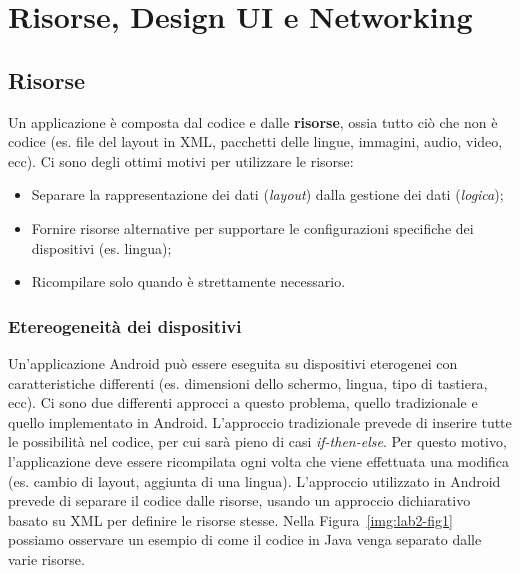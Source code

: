 \newcommand{\myparagraph}[1]{\paragraph{#1}\mbox{}\\}

\chapter{Risorse, Design UI e Networking}

\section{Risorse}

Un applicazione è composta dal codice e dalle \textbf{risorse}, ossia tutto ciò
che non è codice (es. file del layout in XML, pacchetti delle lingue, immagini,
audio, video, ecc).
Ci sono degli ottimi motivi per utilizzare le risorse:

\begin{itemize}
\item Separare la rappresentazione dei dati (\textit{layout}) dalla gestione dei
dati (\textit{logica});
\item Fornire risorse alternative per supportare le configurazioni specifiche
dei dispositivi (es. lingua);
\item Ricompilare solo quando è strettamente necessario.
\end{itemize}

\subsection{Etereogeneità dei dispositivi}

Un'applicazione Android può essere eseguita su dispositivi eterogenei con
caratteristiche differenti (es. dimensioni dello schermo, lingua, tipo di
tastiera, ecc). Ci sono due differenti approcci a questo problema, quello
tradizionale e quello implementato in Android.
L'approccio tradizionale prevede di inserire tutte le possibilità nel codice,
per cui sarà pieno di casi \emph{if-then-else}. Per questo motivo,
l'applicazione deve essere ricompilata ogni volta che viene effettuata una
modifica (es. cambio di layout, aggiunta di una lingua).
L'approccio utilizzato in Android prevede di separare il codice dalle risorse,
usando un approccio dichiarativo basato su XML per definire le risorse stesse.
Nella Figura~\ref{img:lab2-fig1} possiamo osservare un esempio di come il codice
in Java venga separato dalle varie risorse.


